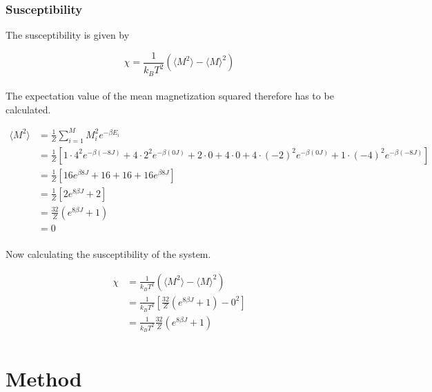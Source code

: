 \documentclass{article}
\begin{document}
\subsubsection{Susceptibility}

The susceptibility is given by

\begin{equation}    \label{eq:susceptibility}
    \chi = \frac{1}{k_B T^2} \left( \langle M^2 \rangle - \langle M \rangle ^2 \right)
\end{equation} \\

The expectation value of the mean magnetization squared therefore has to be calculated.

\begin{align*}
  \langle M^2 \rangle &= \frac{1}{Z} \sum _{i=1} ^M M_i^2 e^{- \beta E_i} \\
  &= \frac{1}{Z} \left[1 \cdot 4^2 e^{- \beta (-8J)} + 4 \cdot 2^2 e^{- \beta (0J)} + 2 \cdot 0 + 4 \cdot 0 + 4 \cdot (-2)^2 e^{- \beta (0J)} + 1 \cdot (-4)^2 e^{- \beta (-8J)} \right] \\
  &= \frac{1}{Z} \left[ 16 e^{\beta 8J} + 16 + 16 + 16 e^{ \beta 8J} \right] \\
  &= \frac{1}{Z} \left[ 2 e^{8 \beta J} + 2 \right] \\
  &= \frac{32}{Z} \left( e^{8 \beta J} + 1 \right) \\
  &= 0 \\
\end{align*}

Now calculating the susceptibility of the system.

\begin{align*}
    \chi &= \frac{1}{k_B T^2} \left( \langle M^2 \rangle - \langle M \rangle ^2 \right) \\
    &= \frac{1}{k_B T^2} \left[ \frac{32}{Z} \left( e^{8 \beta J} + 1 \right) - 0^2 \right] \\
    &= \frac{1}{k_B T^2} \frac{32}{Z} \left( e^{8 \beta J} + 1 \right) \\
\end{align*}







\vspace{1cm}

\section{Method} \label{sec:Method}
\end{document}

